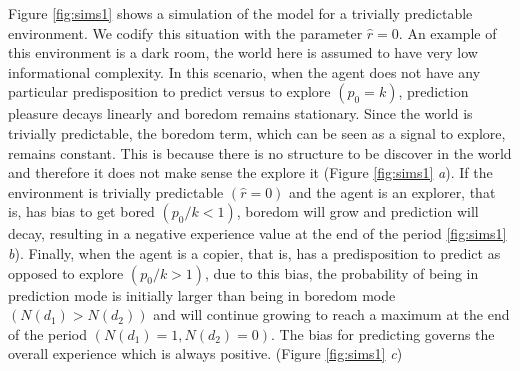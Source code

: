 \documentclass[11pt, onecolumn]{article}
\begin{document}


Figure \ref{fig:sims1} shows a simulation of the model for a trivially predictable environment.
We codify this situation with the parameter $\hat{r} = 0$. An example of this environment is a dark room, the world here is assumed to have very low informational complexity.
In this scenario, when the agent does not have any particular predisposition to predict versus to explore $(p_0 = k)$, prediction pleasure decays linearly and boredom remains stationary. Since the world is trivially predictable, the boredom term, which can be seen as a signal to explore, remains constant. This is because there is no structure to be discover in the world and therefore it does not make sense the explore it (Figure \ref{fig:sims1} \emph{a}). %
If the environment is trivially predictable $(\hat{r} = 0)$ and the agent is an explorer, that is, has bias to get bored $(p_0/k <1)$, boredom will grow and prediction will decay, resulting in a negative experience value at the end of the period \ref{fig:sims1} \emph{b}). %
Finally, when the agent is a copier, that is, has a predisposition to predict as opposed to explore $(p_0/k > 1)$, due to this bias, the probability of being in prediction mode is initially larger than being in boredom mode $(N(d_1) > N(d_2))$ and will continue growing to reach a maximum at the end of the period  $(N(d_1) =1,  N(d_2) =0)$. The bias for predicting governs the overall experience which is always positive. (Figure \ref{fig:sims1} \emph{c}) %
\end{document}
